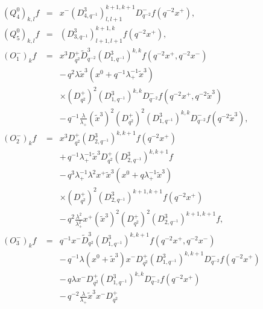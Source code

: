 \documentclass[a4paper,11pt,oneside]{article}
\begin{document}
\begin{enumerate}
\begin{eqnarray}
\left( Q_{4}^{0}\right) _{k,l}f &=&x^{-}\left( D_{4,q^{-1}}^{3}\right)
_{l,l+1}^{k+1,k+1}D_{q^{-2}}^{-}f\left( q^{-2}x^{+}\right) ,  \nonumber \\
\left( Q_{5}^{0}\right) _{k,l}f &=&\left( D_{3,q^{-1}}^{3}\right)
_{l+1,l+1}^{k+1,k}f\left( q^{-2}x^{+}\right) ,  \nonumber \\[0.16in]
\left( O_{1}^{-}\right) _{k}f &=&x^{3}D_{q^{2}}^{+}\tilde{D}%
_{q^{-2}}^{3}\left( D_{1,q^{-1}}^{3}\right) ^{k,k}f\left(
q^{-2}x^{+},q^{-2}x^{-}\right) \\
&&-\,q^{2}\lambda \tilde{x}^{3}\left( x^{0}+q^{-1}\lambda _{+}^{-1}\tilde{x}%
^{3}\right)  \nonumber \\
&&\times \left( D_{q^{2}}^{+}\right) ^{2}\left( D_{1,q^{-1}}^{3}\right)
^{k,k}D_{q^{-2}}^{-}f\left( q^{-2}x^{+},q^{-2}\tilde{x}^{3}\right)  \nonumber
\\
&&-\,q^{-1}\frac{\lambda }{\lambda _{+}}\left( \tilde{x}^{3}\right)
^{2}\left( D_{q^{2}}^{+}\right) ^{2}\left( D_{1,q^{-1}}^{3}\right)
^{k,k}D_{q^{-2}}^{-}f\left( q^{-2}\tilde{x}^{3}\right) ,  \nonumber \\
\left( O_{2}^{-}\right) _{k}f &=&x^{3}D_{q^{2}}^{+}\left(
D_{2,q^{-1}}^{3}\right) ^{k,k+1}f\left( q^{-2}x^{+}\right)  \nonumber \\
&&+\,q^{-1}\lambda _{+}^{-1}\tilde{x}^{3}D_{q^{2}}^{+}\left(
D_{2,q^{-1}}^{3}\right) ^{k,k+1}f  \nonumber \\
&&-\,q^{3}\lambda _{+}^{-1}\lambda ^{2}x^{+}\tilde{x}^{3}\left(
x^{0}+q\lambda _{+}^{-1}\tilde{x}^{3}\right)  \nonumber \\
&&\times \left( D_{q^{2}}^{+}\right) ^{2}\left( D_{2,q^{-1}}^{3}\right)
^{k+1,k+1}f\left( q^{-2}x^{+}\right)  \nonumber \\
&&-\,q^{2}\frac{\lambda ^{2}}{\lambda _{+}^{2}}x^{+}\left( \tilde{x}%
^{3}\right) ^{2}\left( D_{q^{2}}^{+}\right) ^{2}\left(
D_{2,q^{-1}}^{3}\right) ^{k+1,k+1}f,  \nonumber \\
\left( O_{3}^{-}\right) _{k}f &=&q^{-1}x^{-}\tilde{D}_{q^{2}}^{3}\left(
D_{1,q^{-1}}^{3}\right) ^{k,k+1}f\left( q^{-2}x^{+},q^{-2}x^{-}\right) 
\nonumber \\
&&-\,q^{-1}\lambda \left( x^{0}+\tilde{x}^{3}\right)
x^{-}D_{q^{2}}^{+}\left( D_{1,q^{-1}}^{3}\right)
^{k,k+1}D_{q^{-2}}^{-}f\left( q^{-2}x^{+}\right)  \nonumber \\
&&-\,q\lambda x^{-}D_{q^{2}}^{+}\left( D_{1,q^{-1}}^{3}\right)
^{k,k}D_{q^{-2}}^{-}f\left( q^{-2}x^{+}\right)  \nonumber \\
&&-\,q^{-2}\frac{\lambda }{\lambda _{+}}\tilde{x}^{3}x^{-}D_{q^{2}}^{+}%

\end{eqnarray}
\end{enumerate}
\end{document}
